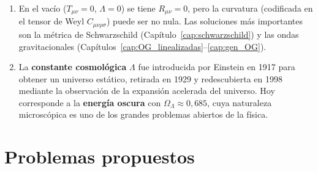 \begin{enumerate}[leftmargin=2em, label=\textbf{\arabic*.}]
  \item En el vacío ($T_{\mu\nu} = 0$, $\Lambda = 0$) se tiene $R_{\mu\nu} = 0$, pero la curvatura (codificada en el tensor de Weyl $C_{\mu\nu\rho\sigma}$) puede ser no nula. Las soluciones más importantes son la métrica de Schwarzschild (Capítulo~\ref{cap:schwarzschild}) y las ondas gravitacionales (Capítulos~\ref{cap:OG_linealizadas}--\ref{cap:gen_OG}).

  \item La \textbf{constante cosmológica} $\Lambda$ fue introducida por Einstein en 1917 para obtener un universo estático, retirada en 1929 y redescubierta en 1998 mediante la observación de la expansión acelerada del universo. Hoy corresponde a la \textbf{energía oscura} con $\Omega_\Lambda \approx 0{,}685$, cuya naturaleza microscópica es uno de los grandes problemas abiertos de la física.

\end{enumerate}

\section{Problemas propuestos}
\label{sec:problemas_cap6}

